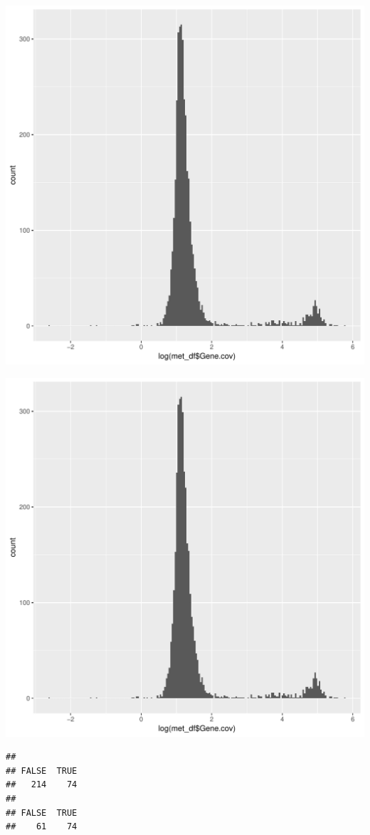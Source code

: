 \documentclass{article}\usepackage[]{graphicx}\usepackage[]{color}
\makeatletter
\def\maxwidth{ %
  \ifdim\Gin@nat@width>\linewidth
    \linewidth
  \else
    \Gin@nat@width
  \fi
}
\newenvironment{kframe}{%
 \def\at@end@of@kframe{}%
 \ifinner\ifhmode%
  \def\at@end@of@kframe{\end{minipage}}%
  \begin{minipage}{\columnwidth}%
 \fi\fi%
 \def\FrameCommand##1{\hskip\@totalleftmargin \hskip-\fboxsep
 \colorbox{shadecolor}{##1}\hskip-\fboxsep
     \hskip-\linewidth \hskip-\@totalleftmargin \hskip\columnwidth}%
 \MakeFramed {\advance\hsize-\width
   \@totalleftmargin\z@ \linewidth\hsize
   \@setminipage}}%
 {\par\unskip\endMakeFramed%
 \at@end@of@kframe}
\newenvironment{knitrout}{}{} %
\makeatother
\begin{document}
\begin{knitrout}
\includegraphics[width=\maxwidth]{figure/import_status_data-2} 

\includegraphics[width=\maxwidth]{figure/import_status_data-3} 
\begin{kframe}\begin{verbatim}
## 
## FALSE  TRUE 
##   214    74
## 
## FALSE  TRUE 
##    61    74
\end{verbatim}
\end{kframe}
\end{knitrout}
\end{document}
